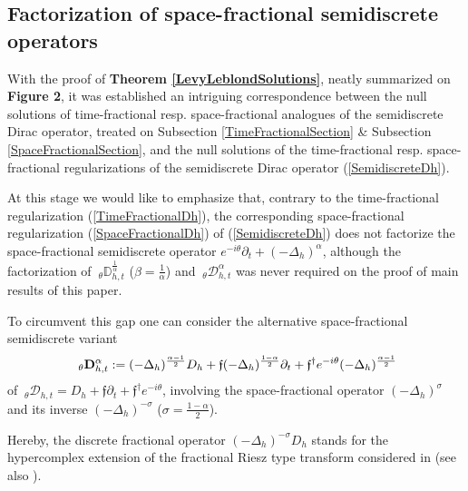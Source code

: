 \documentclass{elsarticle}
\newcommand{\f}{{\mathfrak f}}
\begin{document}

\subsection{Factorization of space-fractional semidiscrete operators}
With the proof of {\bf Theorem \ref{LevyLeblondSolutions}}, neatly summarized on \textbf{Figure 2}, it was established an intriguing correspondence between the null solutions of time-fractional resp. space-fractional analogues of the semidiscrete Dirac operator, treated on Subsection \ref{TimeFractionalSection} \& Subsection \ref{SpaceFractionalSection}, and the null solutions of the time-fractional resp. space-fractional regularizations of the semidiscrete Dirac operator (\ref{SemidiscreteDh}).

At this stage we would like to emphasize that, contrary to the time-fractional regularization (\ref{TimeFractionalDh}), the corresponding space-fractional regularization (\ref{SpaceFractionalDh}) of (\ref{SemidiscreteDh}) does not factorize the space-fractional semidiscrete operator $e^{-i\theta}\partial_t+(-\Delta_h)^{\alpha}$, although the factorization of ${~}_\theta\mathbb{D}_{h,t}^{\frac{1}{\alpha}}$ ($\beta=\frac{1}{\alpha}$) and ${~}_\theta\mathcal{D}_{h,t}^{\alpha}$ was never required on the proof of main results of this paper.

To circumvent this gap one can consider the alternative space-fractional semidiscrete variant 
\begin{eqnarray}
	\label{SpaceFractionalVariant}{~}_\theta{\bf D}_{h,t}^\alpha:=(-\Delta_h)^{\frac{\alpha-1}{2}}D_h+\f (-\Delta_h)^{\frac{1-\alpha}{2}}\partial_t+\f^\dagger e^{-i\theta}(-\Delta_h)^{\frac{\alpha-1}{2}}
\end{eqnarray}
of ${~}_\theta\mathcal{D}_{h,t}=D_h+\f\partial_t+\f^\dagger e^{-i\theta}$, involving the space-fractional operator $(-\Delta_h)^{\sigma}$ and its inverse $(-\Delta_h)^{-\sigma}$ ($\sigma=\frac{1-\alpha}{2}$). 

Hereby, the discrete fractional operator $(-\Delta_h)^{-\sigma}D_h$ stands for the hypercomplex extension of the fractional Riesz type transform considered in \cite[Section 6]{CiaurriGRTV17} (see also \cite[Subsection 21.4.3]{F19}).
\end{document}
